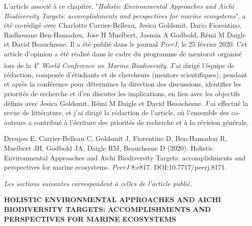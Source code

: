 L'article associé à ce chapitre, "\textit{Holistic Environmental Approaches and Aichi Biodiversity Targets: accomplishments and perspectives for marine ecosystems}", a été co-rédigé avec Charlotte Carrier-Belleau, Jesica Goldsmit, Dario Fiorentino, Radhouane Ben-Hamadou, Jose H Muelbert, Jasmin A Godbold, Rémi M Daigle et David Beauchesne. Il a été publié dans le journal \textit{PeerJ}, le 25 février 2020. Cet article d'opinion a été réalisé dans le cadre du programme de mentorat organisé lors de la 4\textsuperscript{e} \textit{World Conference on Marine Biodiversity}. J'ai dirigé l'équipe de rédaction, composée d'étudiants et de chercheurs (mentors scientifiques), pendant et après la conférence pour déterminer la direction des discussions, identifier les priorités de recherche et d'en discuter les implications, en lien avec les objectifs définis avec Jesica Goldsmit, Rémi M Daigle et David Beauchesne. J'ai effectué la revue de littérature, et j'ai dirigé la rédaction de l'article, où l'ensemble des co-auteurs a contribué à l'écriture des priorités de recherche et à la révision générale. \linebreak[4]

\begin{singlespace}
Dreujou E, Carrier-Belleau C, Goldsmit J, Fiorentino D, Ben-Hamadou R, Muelbert JH, Godbold JA, Daigle RM, Beauchesne D (2020). Holistic Environmental Approaches and Aichi Biodiversity Targets: accomplishments and perspectives for marine ecosystems. \textit{PeerJ} 8:e817. DOI:10.7717/peerj.8171.
\end{singlespace}

\textit{Les sections suivantes correspondent à celles de l'article publié.}

\clearpage

\begin{center}
\textbf{HOLISTIC ENVIRONMENTAL APPROACHES AND AICHI BIODIVERSITY TARGETS: ACCOMPLISHMENTS AND PERSPECTIVES FOR MARINE ECOSYSTEMS}
\end{center}

